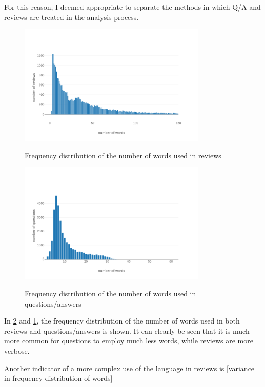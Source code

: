 \documentclass[LaM,binding=0.6cm]{sapthesis}
\begin{document}
For this reason, I deemed appropriate to separate the methods in which Q/A and reviews are treated in the analysis process.

\begin{figure}
\centering
\includegraphics[width=0.8\textwidth]{pictures/reviews_freq_dist.png}\\[3ex]
\caption{Frequency distribution of the number of words used in reviews}
\label{fig:rev-freq-dist}
\end{figure}

\begin{figure}
\centering
\includegraphics[width=0.8\textwidth]{pictures/quest_freq_dist.png}\\[3ex]
\caption{Frequency distribution of the number of words used in questions/answers}
\label{fig:quest-freq-dist}
\end{figure}

In \ref{fig:quest-freq-dist} and \ref{fig:rev-freq-dist}, the frequency distribution of the number of words used in both reviews and questions/answers is shown. It can clearly be seen that it is much more common for questions to employ much less words, while reviews are more verbose.

Another indicator of a more complex use of the language in reviews is [variance in frequency distribution of words]
\end{document}
